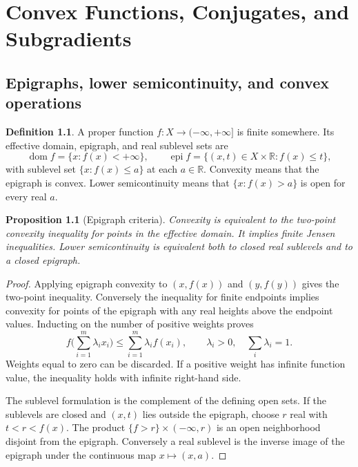 \documentclass[11pt,oneside,openany]{book}
\theoremstyle{plain}
\newtheorem{proposition}[theorem]{Proposition}
\theoremstyle{definition}
\newtheorem{definition}[theorem]{Definition}
\theoremstyle{remark}
\begin{document}
\chapter{Convex Functions, Conjugates, and Subgradients}

\section{Epigraphs, lower semicontinuity, and convex operations}
\label{v02-01}

\begin{definition}
A proper function \(f:X\to(-\infty,+\infty]\) is finite somewhere.
Its effective domain, epigraph, and real sublevel sets are
\[
 \operatorname{dom}f=\{x:f(x)<+\infty\},\qquad
 \operatorname{epi} f=\{(x,t)\in X\times\mathbb R:f(x)\le t\},
\]
with sublevel set \(\{x:f(x)\le a\}\) at each \(a\in\mathbb R\).
Convexity means that the epigraph is convex. Lower semicontinuity
means that \(\{x:f(x)>a\}\) is open for every real \(a\).
\end{definition}

\begin{proposition}[Epigraph criteria]\label{prop:epigraph-criteria}
Convexity is equivalent to the two-point convexity inequality
for points in the effective domain. It implies finite Jensen
inequalities. Lower semicontinuity is equivalent both to
closed real sublevels and to a closed epigraph.
\end{proposition}

\begin{proof}
Applying epigraph convexity to \((x,f(x))\) and \((y,f(y))\)
gives the two-point inequality. Conversely the inequality
for finite endpoints implies convexity for points of the
epigraph with any real heights above the endpoint values.
Inducting on the number of positive weights proves
\[
 f\Big(\sum_{i=1}^m\lambda_i x_i\Big)
 \le \sum_{i=1}^m\lambda_i f(x_i),
 \qquad \lambda_i>0,\quad \sum_i\lambda_i=1 .
\]
Weights equal to zero can be discarded. If a positive weight
has infinite function value, the inequality holds with infinite
right-hand side.

The sublevel formulation is the complement of the defining
open sets. If the sublevels are closed and \((x,t)\) lies
outside the epigraph, choose \(r\) real with \(t<r<f(x)\).
The product \(\{f>r\}\times(-\infty,r)\) is an open
neighborhood disjoint from the epigraph. Conversely a real
sublevel is the inverse image of the epigraph under the
continuous map \(x\mapsto(x,a)\).
\end{proof}
\end{document}
